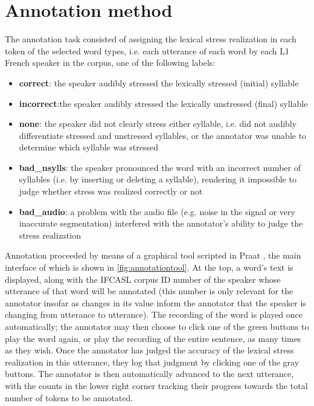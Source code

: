 	\section{Annotation method}
	\label{sec:lexstress:method}

	The annotation task consisted of assigning the lexical stress realization in each token of the selected word types, i.e. each utterance of each word by each L1 French speaker in the corpus, one of the following labels:
	
	\begin{itemize}
	\item{\textbf{correct}: the speaker audibly stressed the lexically stressed (initial) syllable}
	\item{\textbf{incorrect}:the speaker audibly stressed the lexically unstressed (final) syllable}
	\item{\textbf{none}: the speaker did not clearly stress either syllable, i.e. did not audibly differentiate stressed and unstressed syllables, or the annotator was unable to determine which syllable was stressed}
	\item{\textbf{bad\_nsylls}: the speaker pronounced the word with an incorrect number of syllables (i.e. by inserting or deleting a syllable), rendering it impossible to judge whether stress was realized correctly or not}
	\item{\textbf{bad\_audio}: a problem with the audio file (e.g. noise in the signal or very inaccurate segmentation) interfered with the annotator's ability to judge the stress realization}
	 \end{itemize}
	
	Annotation proceeded by means of a graphical tool scripted in Praat \parencite{Boersma2014}, the main interface of which is shown in \cref{fig:annotationtool}. At the top, a word's text is displayed, along with the IFCASL corpus ID number of the speaker whose utterance of that word will be annotated (this number is only relevant for the annotator insofar as changes in its value inform the annotator that the speaker is changing from utterance to utterance). The recording of the word
is played once automatically; the annotator may then choose to click one of the green buttons to play the word again, or play the recording of the entire sentence, as many times as they wish. Once the annotator has judged the accuracy of the lexical stress realization in this utterance, they log that judgment by clicking one of the gray buttons. The annotator is then automatically advanced to the next utterance, with the counts in the lower right corner tracking their progress towards the total number of tokens to be annotated. 
	

